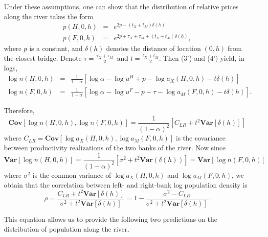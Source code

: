 \documentclass[12pt]{article}
\newcommand{\Var}{\mathbf{Var}}
\newcommand{\Cov}{\mathbf{Cov}}
\begin{document}
Under these assumptions, one can show that the distribution of relative
prices along the river takes the form%
\begin{eqnarray*}
p\left( H,0,h\right) &=&e^{2p-\left( t_{X}+t_{M}\right) \delta \left(
h\right) } \\
p\left( F,0,h\right) &=&e^{2p+\tau _{X}+\tau _{M}+\left( t_{X}+t_{M}\right)
\delta \left( h\right) },
\end{eqnarray*}%
where $p$ is a constant, and $\delta \left( h\right) $ denotes the distance
of location $\left( 0,h\right) $ from the closest bridge. Denote $\tau =%
\frac{\tau _{X}+\tau _{M}}{2}$\ and $t=\frac{t_{X}+t_{M}}{2}$. Then (3') and
(4') yield, in logs,%
\begin{eqnarray*}
\log n\left( H,0,h\right) &=&\frac{1}{1-\alpha }\left[ \log \alpha -\log
u^{H}+p-\log a_{X}\left( H,0,h\right) -t\delta \left( h\right) \right] \\
\log n\left( F,0,h\right) &=&\frac{1}{1-\alpha }\left[ \log \alpha -\log
u^{F}-p-\tau -\log a_{M}\left( F,0,h\right) -t\delta \left( h\right) \right]
.
\end{eqnarray*}

Therefore,%
\begin{equation*}
\Cov\left[ \log n\left( H,0,h\right) ,\log n\left( F,0,h\right) \right] =%
\frac{1}{\left( 1-\alpha \right) ^{2}}\left[ C_{LR}+t^{2}\Var\left[ \delta
\left( h\right) \right] \right]
\end{equation*}%
where $C_{LR}=\Cov\left[ \log a_{X}\left( H,0,h\right) ,\log a_{M}\left(
F,0,h\right) \right] $ is the covariance between productivity realizations
of the two banks of the river. Now since%
\begin{equation*}
\Var\left[ \log n\left( H,0,h\right) \right] =\frac{1}{\left( 1-\alpha
\right) ^{2}}\left[ \sigma ^{2}+t^{2}\Var\left( \delta \left( h\right)
\right) \right] =\Var\left[ \log n\left( F,0,h\right) \right]
\end{equation*}%
where $\sigma ^{2}$ is the common variance of $\log a_{X}\left( H,0,h\right) 
$ and $\log a_{M}\left( F,0,h\right) $, we obtain that the correlation
between left- and right-bank log population density is%
\begin{equation}
\rho =\frac{C_{LR}+t^{2}\Var\left[ \delta \left( h\right) \right] }{\sigma
^{2}+t^{2}\Var\left[ \delta \left( h\right) \right] }=1-\frac{\sigma
^{2}-C_{LR}}{\sigma ^{2}+t^{2}\Var\left[ \delta \left( h\right) \right] }.
\end{equation}

This equation allows us to provide the following two predictions on the
distribution of population along the river.
\end{document}
